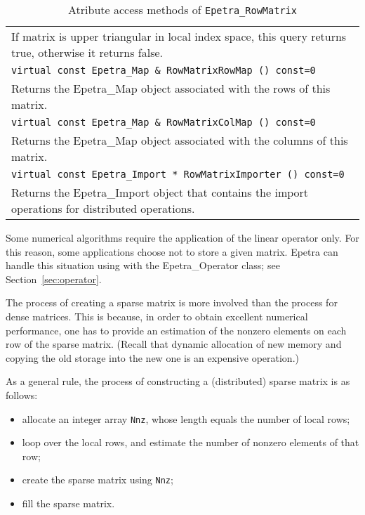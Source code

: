 \begin{table}
\begin{center}
\begin{tabular}{ | p{15cm} | }
If matrix is upper triangular in local index space, this query returns
true, otherwise it returns false. \\
\tt virtual const Epetra\_Map \& 
RowMatrixRowMap () const=0 \\
Returns the Epetra\_Map object associated with the rows of this matrix. \\
\tt virtual const Epetra\_Map \& 
RowMatrixColMap () const=0 \\
Returns the Epetra\_Map object associated with the columns of this
matrix. \\
\tt virtual const Epetra\_Import * 
RowMatrixImporter () const=0 \\
Returns the Epetra\_Import object that contains the import operations for
distributed operations. \\
\hline
\end{tabular}
\caption{Atribute access methods of {\tt Epetra\_RowMatrix}}
\label{tab:row_matrix_atr}
\end{center}
\end{table}



\begin{remark}
  Some numerical algorithms require the application of the linear
  operator only. For this reason, some applications choose not to 
  store a given matrix. Epetra can handle this situation using with the
  Epetra\_Operator class; see Section~\ref{sec:operator}.
\end{remark}

The process of creating a sparse matrix is more involved than the
process for dense matrices. This is because, in order to obtain
excellent numerical performance, one has to provide an estimation of
the nonzero elements on each row of the sparse matrix. (Recall that
dynamic allocation of new memory and copying the old storage into the
new one is an expensive operation.)

As a general rule, the process of constructing a (distributed) sparse
matrix is as follows:
\begin{itemize}
\item allocate an integer array \verb!Nnz!, whose length equals the
  number of local rows;
\item loop over the local rows, and estimate the number of nonzero
  elements of that row;
\item create the sparse matrix using \verb!Nnz!;
\item fill the sparse matrix.
\end{itemize}

